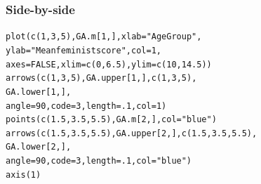 \documentclass{beamer}\usepackage[]{graphicx}\usepackage[]{color}
\makeatletter
\newcommand{\hlnum}[1]{\textcolor[rgb]{0.533,0,0.133}{#1}}%
\newcommand{\hlstr}[1]{\textcolor[rgb]{0.667,0.267,0}{#1}}%
\newcommand{\hlstd}[1]{\textcolor[rgb]{0,0,0}{#1}}%
\newcommand{\hlkwc}[1]{\textcolor[rgb]{0,0,0.4}{#1}}%
\newcommand{\hlkwd}[1]{\textcolor[rgb]{0,0.267,0.4}{#1}}%
\newenvironment{kframe}{%
 \def\at@end@of@kframe{}%
 \ifinner\ifhmode%
  \def\at@end@of@kframe{\end{minipage}}%
  \begin{minipage}{\columnwidth}%
 \fi\fi%
 \def\FrameCommand##1{\hskip\@totalleftmargin \hskip-\fboxsep
 \colorbox{shadecolor}{##1}\hskip-\fboxsep
     \hskip-\linewidth \hskip-\@totalleftmargin \hskip\columnwidth}%
 \MakeFramed {\advance\hsize-\width
   \@totalleftmargin\z@ \linewidth\hsize
   \@setminipage}}%
 {\par\unskip\endMakeFramed%
 \at@end@of@kframe}
\newenvironment{knitrout}{}{} %
\makeatother
\begin{document}
\begin{frame}[fragile]
  \frametitle{Side-by-side}
\begin{knitrout}
\color{fgcolor}\begin{kframe}
\begin{alltt}
\hlkwd{plot}\hlstd{(}\hlkwd{c}\hlstd{(}\hlnum{1}\hlstd{,} \hlnum{3}\hlstd{,} \hlnum{5}\hlstd{), GA.m[}\hlnum{1}\hlstd{, ],} \hlkwc{xlab} \hlstd{=} \hlstr{"Age Group"}\hlstd{,}
     \hlkwc{ylab} \hlstd{=} \hlstr{"Mean feminist score"}\hlstd{,}\hlkwc{col} \hlstd{=} \hlnum{1}\hlstd{,}
     \hlkwc{axes} \hlstd{=} \hlnum{FALSE}\hlstd{,} \hlkwc{xlim} \hlstd{=} \hlkwd{c}\hlstd{(}\hlnum{0}\hlstd{,} \hlnum{6.5}\hlstd{),} \hlkwc{ylim} \hlstd{=} \hlkwd{c}\hlstd{(}\hlnum{10}\hlstd{,} \hlnum{14.5}\hlstd{))}
\hlkwd{arrows}\hlstd{(}\hlkwd{c}\hlstd{(}\hlnum{1}\hlstd{,} \hlnum{3}\hlstd{,} \hlnum{5}\hlstd{), GA.upper[}\hlnum{1}\hlstd{, ],} \hlkwd{c}\hlstd{(}\hlnum{1}\hlstd{,} \hlnum{3}\hlstd{,} \hlnum{5}\hlstd{),}
       \hlstd{GA.lower[}\hlnum{1}\hlstd{, ],}
       \hlkwc{angle} \hlstd{=} \hlnum{90}\hlstd{,} \hlkwc{code} \hlstd{=} \hlnum{3}\hlstd{,} \hlkwc{length} \hlstd{=} \hlnum{.1}\hlstd{,} \hlkwc{col} \hlstd{=} \hlnum{1}\hlstd{)}
\hlkwd{points}\hlstd{(}\hlkwd{c}\hlstd{(}\hlnum{1.5}\hlstd{,} \hlnum{3.5}\hlstd{,} \hlnum{5.5}\hlstd{),GA.m[}\hlnum{2}\hlstd{, ],} \hlkwc{col} \hlstd{=} \hlstr{"blue"}\hlstd{)}
\hlkwd{arrows}\hlstd{(}\hlkwd{c}\hlstd{(}\hlnum{1.5}\hlstd{,} \hlnum{3.5}\hlstd{,} \hlnum{5.5}\hlstd{), GA.upper[}\hlnum{2}\hlstd{, ],} \hlkwd{c}\hlstd{(}\hlnum{1.5}\hlstd{,} \hlnum{3.5}\hlstd{,} \hlnum{5.5}\hlstd{),}
       \hlstd{GA.lower[}\hlnum{2}\hlstd{, ],}
       \hlkwc{angle} \hlstd{=} \hlnum{90}\hlstd{,} \hlkwc{code} \hlstd{=} \hlnum{3}\hlstd{,} \hlkwc{length} \hlstd{=} \hlnum{.1}\hlstd{,} \hlkwc{col} \hlstd{=} \hlstr{"blue"}\hlstd{)}
\hlkwd{axis}\hlstd{(}\hlnum{1}\hlstd{)}
\end{alltt}
\end{kframe}
\end{knitrout}
\end{frame} 
\end{document}
